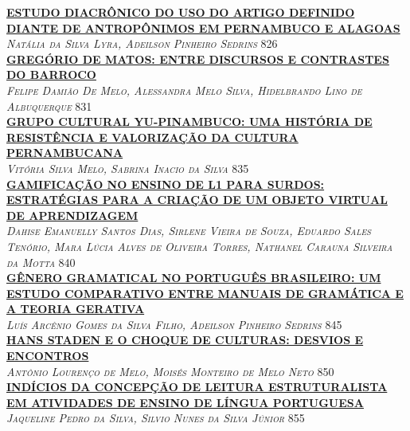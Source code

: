 \noindent \textsc{\hyperlink{trabalhos/250280.pdf.1}{\textbf{ESTUDO DIACRÔNICO DO USO DO ARTIGO DEFINIDO DIANTE DE ANTROPÔNIMOS EM PERNAMBUCO E ALAGOAS}}}\\ 
\noindent \textsc{\textit{Natália da Silva Lyra, Adeilson Pinheiro Sedrins}} \hfill 826\\ 

\noindent \textsc{\hyperlink{trabalhos/250005.pdf.1}{\textbf{GREGÓRIO DE MATOS: ENTRE DISCURSOS E CONTRASTES DO BARROCO}}}\\ 
\noindent \textsc{\textit{Felipe Damião De Melo, Alessandra Melo Silva, Hidelbrando Lino de Albuquerque}} \hfill 831\\ 

\noindent \textsc{\hyperlink{trabalhos/250163.pdf.1}{\textbf{GRUPO CULTURAL YU-PINAMBUCO: UMA HISTÓRIA DE RESISTÊNCIA E VALORIZAÇÃO DA CULTURA PERNAMBUCANA}}}\\ 
\noindent \textsc{\textit{Vitória Silva Melo, Sabrina Inacio da Silva}} \hfill 835\\ 

\noindent \textsc{\hyperlink{trabalhos/250277.pdf.1}{\textbf{GAMIFICAÇÃO NO ENSINO DE L1 PARA SURDOS: ESTRATÉGIAS PARA A CRIAÇÃO DE UM OBJETO VIRTUAL DE APRENDIZAGEM}}}\\ 
\noindent \textsc{\textit{Dahise Emanuelly Santos Dias, Sirlene Vieira de Souza, Eduardo Sales Tenório, Mara Lúcia Alves de Oliveira Torres, Nathanel Carauna Silveira da Motta}} \hfill 840\\ 

\noindent \textsc{\hyperlink{trabalhos/250035.pdf.1}{\textbf{GÊNERO GRAMATICAL NO PORTUGUÊS BRASILEIRO: UM ESTUDO COMPARATIVO ENTRE MANUAIS DE GRAMÁTICA E A TEORIA GERATIVA}}}\\ 
\noindent \textsc{\textit{Luís Arcênio Gomes da Silva Filho, Adeilson Pinheiro Sedrins}} \hfill 845\\ 

\noindent \textsc{\hyperlink{trabalhos/248963.pdf.1}{\textbf{HANS STADEN E O CHOQUE DE CULTURAS: DESVIOS E ENCONTROS}}}\\ 
\noindent \textsc{\textit{Antônio Lourenço de Melo, Moisés Monteiro de Melo Neto}} \hfill 850\\ 

\noindent \textsc{\hyperlink{trabalhos/250098.pdf.1}{\textbf{INDÍCIOS DA CONCEPÇÃO DE LEITURA ESTRUTURALISTA EM ATIVIDADES DE ENSINO DE LÍNGUA PORTUGUESA}}}\\ 
\noindent \textsc{\textit{Jaqueline Pedro da Silva, Silvio Nunes da Silva Júnior}} \hfill 855\\ 

